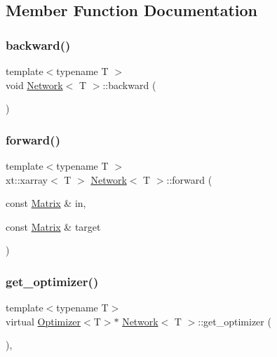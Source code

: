 \subsection{Member Function Documentation}
\mbox{\label{class_network_a0656d4106aded16e8663ff8fbfec1f3e}} 
\subsubsection{\texorpdfstring{backward()}{backward()}}
{\footnotesize\ttfamily template$<$typename T $>$ \\
void \mbox{\hyperlink{class_network}{Network}}$<$ T $>$\+::backward (\begin{DoxyParamCaption}{ }\end{DoxyParamCaption})\hspace{0.3cm}{\ttfamily [virtual]}}

\mbox{\label{class_network_aff4e815a38ab13b083676bef1b8ff1a9}} 
\subsubsection{\texorpdfstring{forward()}{forward()}}
{\footnotesize\ttfamily template$<$typename T $>$ \\
xt\+::xarray$<$ T $>$ \mbox{\hyperlink{class_network}{Network}}$<$ T $>$\+::forward (\begin{DoxyParamCaption}\item[{const \mbox{\hyperlink{class_network_a3217727df6a4bde68fb686293258d7f6}{Matrix}} \&}]{in,  }\item[{const \mbox{\hyperlink{class_network_a3217727df6a4bde68fb686293258d7f6}{Matrix}} \&}]{target }\end{DoxyParamCaption})\hspace{0.3cm}{\ttfamily [virtual]}}

\mbox{\label{class_network_aca741bb11b2d6070727d7bc306e2acfc}} 
\subsubsection{\texorpdfstring{get\_optimizer()}{get\_optimizer()}}
{\footnotesize\ttfamily template$<$typename T$>$ \\
virtual \mbox{\hyperlink{class_optimizer}{Optimizer}}$<$T$>$$\ast$ \mbox{\hyperlink{class_network}{Network}}$<$ T $>$\+::get\+\_\+optimizer (\begin{DoxyParamCaption}{ }\end{DoxyParamCaption})\hspace{0.3cm}{\ttfamily [inline]}, {\ttfamily [virtual]}}

